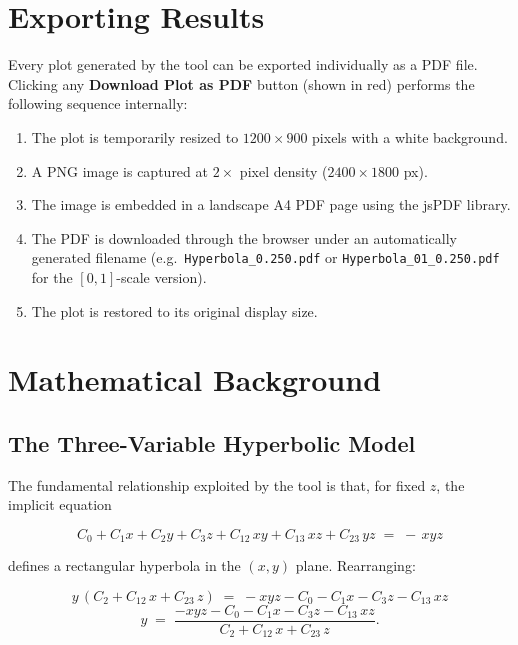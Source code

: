\documentclass[12pt,a4paper]{article}
\begin{document}
\section{Exporting Results}

Every plot generated by the tool can be exported individually as a PDF file.
Clicking any \textbf{Download Plot as PDF} button (shown in red) performs the
following sequence internally:

\begin{enumerate}[leftmargin=1.5em]
    \item The plot is temporarily resized to $1200 \times 900$ pixels with a white
          background.
    \item A PNG image is captured at $2\times$ pixel density ($2400 \times 1800$ px).
    \item The image is embedded in a landscape A4 PDF page using the jsPDF library.
    \item The PDF is downloaded through the browser under an automatically generated
          filename (e.g.\ \texttt{Hyperbola\_0.250.pdf} or
          \texttt{Hyperbola\_01\_0.250.pdf} for the $[0,1]$-scale version).
    \item The plot is restored to its original display size.
\end{enumerate}

\section{Mathematical Background}

\subsection{The Three-Variable Hyperbolic Model}

The fundamental relationship exploited by the tool is that, for fixed $z$, the
implicit equation

\[
    C_0 + C_1 x + C_2 y + C_3 z + C_{12}\,xy + C_{13}\,xz + C_{23}\,yz
    \;=\; -\,xyz
\]

defines a rectangular hyperbola in the $(x, y)$ plane.  Rearranging:

\[
    y\,(C_2 + C_{12}\,x + C_{23}\,z)
    \;=\; -xyz - C_0 - C_1 x - C_3 z - C_{13}\,xz
\]
\[
    y \;=\; \frac{-xyz - C_0 - C_1 x - C_3 z - C_{13}\,xz}
                 {C_2 + C_{12}\,x + C_{23}\,z}.
\]
\end{document}
